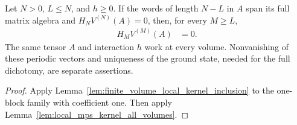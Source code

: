 \begin{lemma}
    \label{lem:finite_ring_constraint_all_volumes}
    \leanok
    Let $N>0$, $L\le N$, and $h\ge0$. If the words of length $N-L$ in $A$
    span its full matrix algebra and $H_NV^{(N)}(A)=0$, then, for every
    $M\ge L$,
    \begin{align}
        H_MV^{(M)}(A) & =0.
        \label{eq:finite_ring_constraint_all_volumes}
    \end{align}
    The same tensor $A$ and interaction $h$ work at every volume. Nonvanishing
    of these periodic vectors and uniqueness of the ground state, needed for
    the full dichotomy, are separate assertions.
\end{lemma}
\begin{proof}\leanok
    Apply Lemma~\ref{lem:finite_volume_local_kernel_inclusion} to the one-block
    family with coefficient one. Then apply
    Lemma~\ref{lem:local_mps_kernel_all_volumes}.
\end{proof}
